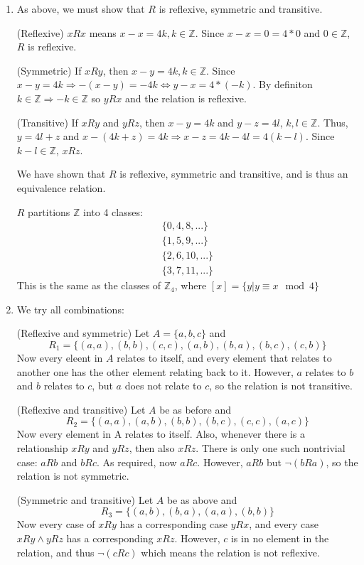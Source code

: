 \documentclass{article}
\begin{document}
\begin{enumerate}
    \item 
        As above, we must show that $R$ is reflexive, symmetric and transitive.

        (Reflexive) $xRx$ means $x-x = 4k, k \in \mathbb{Z}$. Since $x-x = 0 = 4*0$ and $0 \in \mathbb{Z}$, $R$ is reflexive.

        (Symmetric) If $xRy$, then $x-y = 4k, k\in \mathbb{Z}$. Since $x-y=4k \Rightarrow -(x - y) = -4k \Leftrightarrow y - x = 4*(-k)$. By definiton $k \in \mathbb{Z} \Rightarrow -k \in \mathbb{Z}$ so $yRx$ and the relation is reflexive.

        (Transitive) If $xRy$ and $yRz$, then $x - y = 4k$ and $y - z = 4l$, $k,l \in \mathbb{Z}$. Thus, $y = 4l + z$ and $x - (4k + z) = 4k \Rightarrow x - z = 4k - 4l = 4(k - l)$. Since $k-l \in \mathbb{Z}$, $xRz$.

        We have shown that $R$ is reflexive, symmetric and transitive, and is thus an equivalence relation.

        $R$ partitions $\mathbb{Z}$ into 4 classes: 
        \begin{align*}
            \{0,4,8, ...\} \\
            \{1,5,9, ...\} \\
            \{2, 6, 10, ...\} \\
            \{3, 7, 11, ...\}
        \end{align*}
        This is the same as the classes of $\mathbb{Z}_4$, where $[x] = \{ y | y \equiv x \mod{4}\}$


    \item 
        We try all combinations:

        (Reflexive and symmetric) Let $A = \{a,b,c\}$ and 
        $$R_1 = \{(a,a), (b,b), (c,c), (a,b), (b,a), (b,c), (c,b)\}$$ Now every eleent in $A$ relates to itself, and every element that relates to another one has the other element relating back to it. However, $a$ relates to $b$ and $b$ relates to $c$, but $a$ does not relate to $c$, so the relation is not transitive.

        (Reflexive and transitive) Let $A$ be as before and 
        $$R_2 = \{(a,a), (a,b), (b,b), (b,c), (c,c), (a,c)\}$$
        Now every element in A relates to itself. Also, whenever there is a relationship $xRy$ and $yRz$, then also $xRz$. There is only one such nontrivial case: $aRb$ and $bRc$. As required, now $aRc$. However, $aRb$ but $\lnot(b R a)$, so the relation is not symmetric. 

        (Symmetric and transitive) Let $A$ be as above and 
        $$R_3 = \{(a,b),(b,a), (a,a), (b,b)\}$$
        Now every case of $xRy$ has a corresponding case $yRx$, and every case $xRy \land yRz$ has a corresponding $xRz$. However, $c$ is in no element in the relation, and thus $\lnot(cRc)$ which means the relation is not reflexive.


\end{enumerate}
\end{document}
